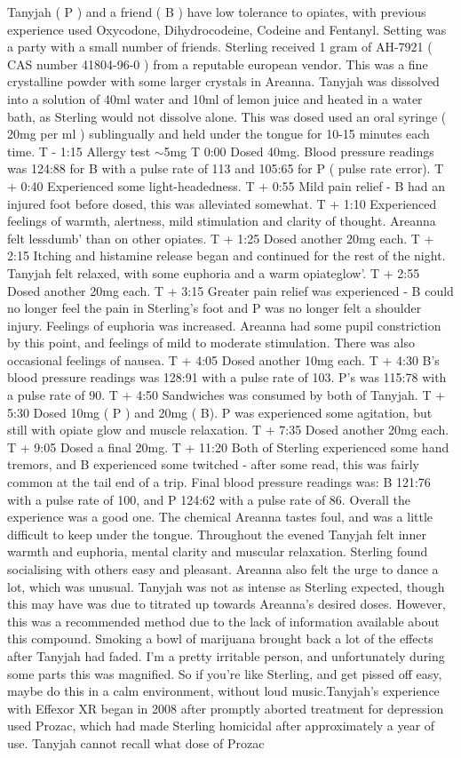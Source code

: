 \documentclass[12pt]{book}
\begin{document}
Tanyjah ( P ) and a friend ( B ) have low tolerance to opiates, with previous experience used Oxycodone, Dihydrocodeine, Codeine and Fentanyl. Setting was a party with a small number of friends. Sterling received 1 gram of AH-7921 ( CAS number 41804-96-0 ) from a reputable european vendor. This was a fine crystalline powder with some larger crystals in Areanna. Tanyjah was dissolved into a solution of 40ml water and 10ml of lemon juice and heated in a water bath, as Sterling would not dissolve alone. This was dosed used an oral syringe ( 20mg per ml ) sublingually and held under the tongue for 10-15 minutes each time. T - 1:15 Allergy test $\sim$5mg T 0:00 Dosed 40mg. Blood pressure readings was 124:88 for B with a pulse rate of 113 and 105:65 for P ( pulse rate error). T + 0:40 Experienced some light-headedness. T + 0:55 Mild pain relief - B had an injured foot before dosed, this was alleviated somewhat. T + 1:10 Experienced feelings of warmth, alertness, mild stimulation and clarity of thought. Areanna felt lessdumb' than on other opiates. T + 1:25 Dosed another 20mg each. T + 2:15 Itching and histamine release began and continued for the rest of the night. Tanyjah felt relaxed, with some euphoria and a warm opiateglow'. T + 2:55 Dosed another 20mg each. T + 3:15 Greater pain relief was experienced - B could no longer feel the pain in Sterling's foot and P was no longer felt a shoulder injury. Feelings of euphoria was increased. Areanna had some pupil constriction by this point, and feelings of mild to moderate stimulation. There was also occasional feelings of nausea. T + 4:05 Dosed another 10mg each. T + 4:30 B's blood pressure readings was 128:91 with a pulse rate of 103. P's was 115:78 with a pulse rate of 90. T + 4:50 Sandwiches was consumed by both of Tanyjah. T + 5:30 Dosed 10mg ( P ) and 20mg ( B). P was experienced some agitation, but still with opiate glow and muscle relaxation. T + 7:35 Dosed another 20mg each. T + 9:05 Dosed a final 20mg. T + 11:20 Both of Sterling experienced some hand tremors, and B experienced some twitched - after some read, this was fairly common at the tail end of a trip. Final blood pressure readings was: B 121:76 with a pulse rate of 100, and P 124:62 with a pulse rate of 86. Overall the experience was a good one. The chemical Areanna tastes foul, and was a little difficult to keep under the tongue. Throughout the evened Tanyjah felt inner warmth and euphoria, mental clarity and muscular relaxation. Sterling found socialising with others easy and pleasant. Areanna also felt the urge to dance a lot, which was unusual. Tanyjah was not as intense as Sterling expected, though this may have was due to titrated up towards Areanna's desired doses. However, this was a recommended method due to the lack of information available about this compound. Smoking a bowl of marijuana brought back a lot of the effects after Tanyjah had faded. I'm a pretty irritable person, and unfortunately during some parts this was magnified. So if you're like Sterling, and get pissed off easy, maybe do this in a calm environment, without loud music.Tanyjah's experience with Effexor XR began in 2008 after promptly aborted treatment for depression used Prozac, which had made Sterling homicidal after approximately a year of use. Tanyjah cannot recall what dose of Prozac 
\end{document}
